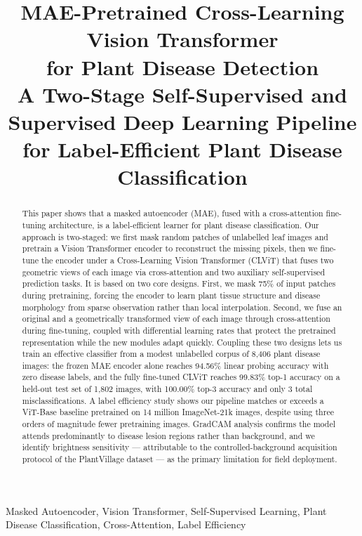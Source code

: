 \documentclass[conference]{IEEEtran}
\begin{document}
\title{
MAE-Pretrained Cross-Learning Vision Transformer\\
for Plant Disease Detection\\
\large A Two-Stage Self-Supervised and Supervised Deep Learning Pipeline
for Label-Efficient Plant Disease Classification
}



\maketitle

\begin{abstract}
This paper shows that a masked autoencoder (MAE), fused with a cross-attention fine-tuning architecture, is a label-efficient learner for plant disease classification. Our approach is two-staged: we first mask random patches of unlabelled leaf images and pretrain a Vision Transformer encoder to reconstruct the missing pixels, then we fine-tune the encoder under a Cross-Learning Vision Transformer (CLViT) that fuses two geometric views of each image via cross-attention and two auxiliary self-supervised prediction tasks. It is based on two core designs. First, we mask 75\% of input patches during pretraining, forcing the encoder to learn plant tissue structure and disease morphology from sparse observation rather than local interpolation. Second, we fuse an original and a geometrically transformed view of each image through cross-attention during fine-tuning, coupled with differential learning rates that protect the pretrained representation while the new modules adapt quickly. Coupling these two designs lets us train an effective classifier from a modest unlabelled corpus of 8,406 plant disease images: the frozen MAE encoder alone reaches 94.56\% linear probing accuracy with zero disease labels, and the fully fine-tuned CLViT reaches 99.83\% top-1 accuracy on a held-out test set of 1,802 images, with 100.00\% top-3 accuracy and only 3 total misclassifications. A label efficiency study shows our pipeline matches or exceeds a ViT-Base baseline pretrained on 14 million ImageNet-21k images, despite using three orders of magnitude fewer pretraining images. GradCAM analysis confirms the model attends predominantly to disease lesion regions rather than background, and we identify brightness sensitivity — attributable to the controlled-background acquisition protocol of the PlantVillage dataset — as the primary limitation for field deployment.
\end{abstract}
\vspace{0.5em}
\begin{IEEEkeywords}
Masked Autoencoder, Vision Transformer, Self-Supervised Learning,
Plant Disease Classification, Cross-Attention, Label Efficiency
\end{IEEEkeywords}
\end{document}
